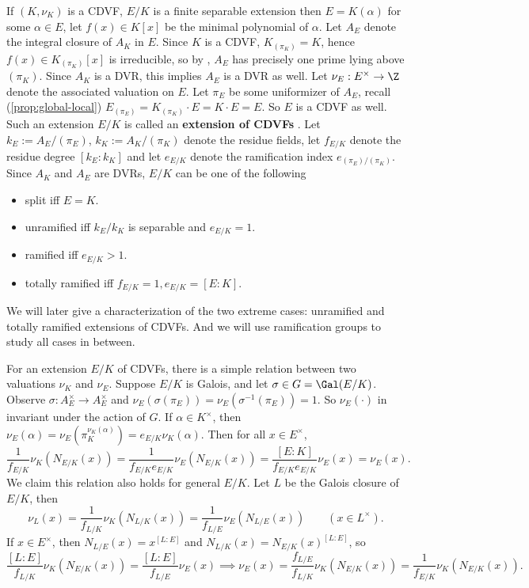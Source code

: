 \documentclass[11pt]{amsart}
\begin{document}
If $(K, \nu_K)$ is a CDVF, $E/K$ is a finite separable extension then $E =
K(\alpha)$ for some $\alpha \in E$, let $f(x) \in K[x]$ be the minimal
polynomial of $\alpha$.  Let $A_E$ denote the integral closure of $A_K$ in $E$.
Since $K$ is a CDVF, $K_{(\pi_K)} = K$, hence $f(x) \in K_{(\pi_K)}[x]$ is
irreducible, so by , $A_E$ has precisely one prime lying
above $(\pi_K)$.  Since $A_K$ is a DVR, this implies $A_E$ is a DVR as well.
Let $\nu_E : E^{\times} \to \Z$ denote the associated valuation on $E$.  Let
$\pi_E$ be some uniformizer of $A_E$, recall (\cref{prop:global-local})
$E_{(\pi_E)} = K_{(\pi_K)} \cdot E = K \cdot E = E$.  So $E$ is a CDVF as well.
Such an extension $E/K$ is called an {\bf extension of CDVFs} \label{extension
    of CDVFs}.
Let $k_E := A_E/(\pi_E)$, $k_K := A_K/(\pi_K)$ denote the residue fields, let
$f_{E/K}$ denote the residue degree $[k_E : k_K]$ and let $e_{E/K}$ denote the
ramification index $e_{(\pi_E)/(\pi_K)}$.  Since $A_K$ and $A_E$ are DVRs, $E/K$
can be one of the following

\begin{itemize}
    \item split iff $E = K$.
    \item unramified iff $k_E/k_K$ is separable and $e_{E/K} = 1$.
    \item ramified iff $e_{E/K} > 1$.
    \item totally ramified iff $f_{E/K} = 1, e_{E/K} = [E : K]$.
\end{itemize}

We will later give a characterization of the two extreme cases: unramified and
totally ramified extensions of CDVFs.  And we will use ramification groups to
study all cases in between.

\medskip

For an extension $E/K$ of CDVFs, there is a simple relation between two
valuations $\nu_K$ and $\nu_E$.  Suppose $E/K$ is Galois, and let $\sigma \in
G = \Gal(E/K)$.  Observe $\sigma : A_E^{\times} \to A_E^{\times}$ and
$\nu_E(\sigma(\pi_E)) = \nu_E(\sigma^{-1}(\pi_E)) = 1$.  So $\nu_E(\cdot)$ in
invariant under the action of $G$.  If $\alpha \in K^{\times}$, then
$\nu_E(\alpha) = \nu_E(\pi_K^{\nu_K(\alpha)}) = e_{E/K} \nu_K(\alpha)$.  Then
for all $x \in E^{\times}$,
\[
    \frac{1}{f_{E/K}} \nu_K(N_{E/K}(x))
    = \frac{1}{f_{E/K} e_{E/K}} \nu_E(N_{E/K}(x))
    = \frac{[E : K]}{f_{E/K} e_{E/K}} \nu_E(x) = \nu_E(x).
\]
We claim this relation also holds for general $E/K$.  Let $L$ be the Galois
closure of $E/K$, then
\[
    \nu_L(x) = \frac{1}{f_{L/K}} \nu_K(N_{L/K}(x)) = \frac{1}{f_{L/E}}
    \nu_E(N_{L/E}(x)) \qquad (x \in L^{\times}).
\]
If $x \in E^{\times}$, then $N_{L/E}(x) = x^{[L:E]}$ and $N_{L/K}(x) =
N_{E/K}(x)^{[L : E]}$, so
\[
    \frac{[L : E]}{f_{L/K}} \nu_K(N_{E/K}(x)) = \frac{[L : E]}{f_{L/E}}
    \nu_E(x)
    \implies
    \nu_E(x) = \frac{f_{L/E}}{f_{L/K}} \nu_K(N_{E/K}(x))
    = \frac{1}{f_{E/K}} \nu_K(N_{E/K}(x)).
\]
\end{document}
